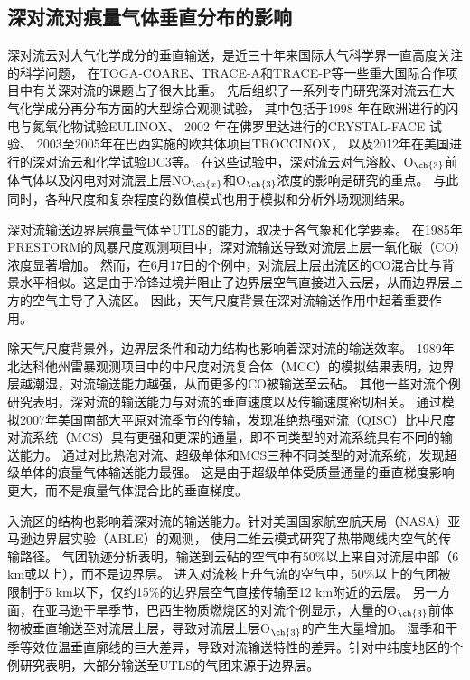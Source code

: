 \subsection{深对流对痕量气体垂直分布的影响}

深对流云对大气化学成分的垂直输送，是近三十年来国际大气科学界一直高度关注的科学问题，
在TOGA-COARE\citep{Webster.1992}、TRACE-A\citep{Fishman.1996}和TRACE-P\citep{Jacob.2003}等一些重大国际合作项目中有关深对流的课题占了很大比重。
先后组织了一系列专门研究深对流云在大气化学成分再分布方面的大型综合观测试验，
其中包括于1998 年在欧洲进行的闪电与氮氧化物试验EULINOX\citep{Holler.2000}、
2002 年在佛罗里达进行的CRYSTAL-FACE 试验\citep{Toon.2003}、
2003至2005年在巴西实施的欧共体项目TROCCINOX\citep{Huntrieser.2008}，
以及2012年在美国进行的深对流云和化学试验DC3\citep{Barth.2019}等。
在这些试验中，深对流云对气溶胶、O$_{\ch{3}}$前体气体以及闪电对对流层上层NO$_{\ch{x}}$和O$_{\ch{3}}$浓度的影响是研究的重点。
与此同时，各种尺度和复杂程度的数值模式也用于模拟和分析外场观测结果。

深对流输送边界层痕量气体至UTLS的能力，取决于各气象和化学要素。
在1985年PRESTORM的风暴尺度观测项目中，深对流输送导致对流层上层一氧化碳（CO）浓度显著增加\citep{Dickerson.1987,Pickering.1989}。
然而，在6月17日的个例中，对流层上层出流区的CO混合比与背景水平相似。这是由于冷锋过境并阻止了边界层空气直接进入云层，从而边界层上方的空气主导了入流区\citep{Pickering.1988}。
因此，天气尺度背景在深对流输送作用中起着重要作用。

除天气尺度背景外，边界层条件和动力结构也影响着深对流的输送效率。
1989年北达科他州雷暴观测项目中的中尺度对流复合体（MCC）的模拟结果表明，边界层越潮湿，对流输送能力越强，从而更多的CO被输送至云砧\citep{Stenchikov.1996}。
其他一些对流个例研究表明，深对流的输送能力与对流的垂直速度以及传输速度密切相关\citep{Pickering.1992a,Wang.1996}。
\citet{Bigelbach.2014}通过模拟2007年美国南部大平原对流季节的传输，发现准绝热强对流（QISC）比中尺度对流系统（MCS）具有更强和更深的通量，即不同类型的对流系统具有不同的输送能力。
\citet{Li.2017b}通过对比热泡对流、超级单体和MCS三种不同类型的对流系统，发现超级单体的痕量气体输送能力最强。
这是由于超级单体受质量通量的垂直梯度影响更大，而不是痕量气体混合比的垂直梯度。

入流区的结构也影响着深对流的输送能力。针对美国国家航空航天局（NASA）亚马逊边界层实验（ABLE）的观测，
\citet{Scala.1990}使用二维云模式研究了热带飑线内空气的传输路径。
气团轨迹分析表明，输送到云砧的空气中有50\%以上来自对流层中部（6 km或以上），而不是边界层。
进入对流核上升气流的空气中，50\%以上的气团被限制于5 km以下，仅约15\%的边界层空气直接传输至12 km附近的云层。
另一方面，在亚马逊干旱季节，巴西生物质燃烧区的对流个例显示，大量的O$_{\ch{3}}$前体物被垂直输送至对流层上层，导致对流层上层O$_{\ch{3}}$的产生大量增加\citep{Pickering.1992,Pickering.1992a,Pickering.1996}。
湿季和干季等效位温垂直廓线的巨大差异，导致对流输送特性的差异。针对中纬度地区的个例研究表明，大部分输送至UTLS的气团来源于边界层\citep{Mullendore.2005,Skamarock.2000}。

